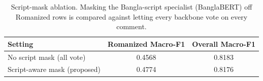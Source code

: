 \begin{table}[!htbp]
\centering
\caption{Script-mask ablation. Masking the Bangla-script specialist (BanglaBERT) off Romanized rows is compared against letting every backbone vote on every comment.}
\label{tab:scriptmask}
\small
\begin{tabular}{@{}lcc@{}}
\toprule
\textbf{Setting} & \textbf{Romanized Macro-F1} & \textbf{Overall Macro-F1} \\
\midrule
No script mask (all vote) & 0.4568 & 0.8183 \\
Script-aware mask (proposed) & 0.4774 & 0.8176 \\
\bottomrule
\end{tabular}
\end{table}